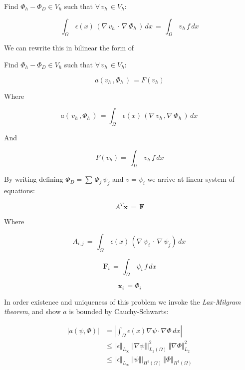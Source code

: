 \documentclass[10pt]{report}
\numberwithin{equation}{section}
\begin{document}
\begin{center}
Find $\Phi_{h}-\Phi_{D} \in V_{h}$ such that $\forall \,  v_{h} \, \in  V_{h}$:
\end{center}

\begin{equation}\label{eq:PoissonWeakForm}
\int_{\Omega} \, \epsilon(x) \, \left(  \nabla \, v_{h} \, \cdot \,  \nabla  \, \Phi_{h} \, 
\right) \, dx \, 
=  \, \int_{\Omega}  \, v_{h} \,  f \, dx 
\end{equation}

\vspace{3mm}


\noindent
We can rewrite this in bilinear the form of 

\begin{center}
Find $\Phi_{h}-\Phi_{D} \in V_{h}$ such that $\forall \,  v_{h} \, \in  V_{h}$:
\end{center}

\begin{equation}\label{eq:PoissonBilinear}
a \left( v_{h} \, , \Phi_{h} \, \right) \,  
=  F(v_{h})
\end{equation}


\noindent
Where 

$$a\left( \, v_{h} \, , \Phi_{h} \, \right) \, =
  \int_{\Omega} \, \epsilon(x) \, \left( \nabla \, v_{h} \, ,  \nabla  \, \Phi_{h} \,
 \right) \, dx \, $$ 
 
 
\noindent
And 


$$ F(v_{h})  =  \, \int_{\Omega} \, v_{h} \,  f  \, dx $$


\noindent
By writing defining $\Phi_{D} = \sum \, \Phi_{j} \, \psi_{j}$ and $v = \psi_{i}$ we arrive at linear system of equations:

$$ A^{T} \textbf{x} \, = \, \textbf{F} $$


\noindent
Where 

$$ A_{i,j} \, = \,   \int_{\Omega} \, \epsilon(x) \, \left(  \nabla  \, \psi_{i} \, \cdot \, \nabla \, \psi_{j} \right) \, dx \, $$


$$ \textbf{F}_{i} \, =  \, \int_{\Omega} \,  \psi_{i} \,  f \,dx $$


$$ \textbf{x}_{i} \, = \Phi_{i} $$



\noindent
In order existence and uniqueness of this problem we invoke the \textit{Lax-Milgram theorem}, and show $a$ is bounded by Cauchy-Schwarts:



\begin{align*}
|a(\psi, \Phi)| &= |\int_{\Omega} \epsilon(x) \nabla \psi \cdot \nabla \Phi \, dx |  \\
&\leq \Vert \epsilon \Vert_{L_{\infty}} \, \Vert \nabla \psi \Vert|^{2}_{L_{2}(\Omega)} \, \Vert \nabla \Phi \Vert^{2}_{L_{2}} \,  \\
&\leq \Vert \epsilon \Vert_{L_{\infty}} \,  \Vert  \psi \Vert|_{H^{1}(\Omega)} \, \Vert \Phi \Vert_{H^{1}(\Omega)} 
\end{align*}
\end{document}
